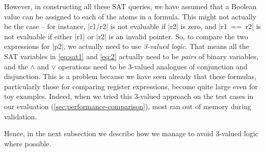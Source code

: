 {%
However, in constructing all these SAT queries, we have assumed that a Boolean
value can be assigned to each of the atoms in a formula. This might not actually be the case -- for instance,
\rtlinline|r1/r2| is not evaluable if \rtlinline|r2| is zero, and
\rtlinline|r1 == r2| is not evaluable if either \rtlinline|r1| or \rtlinline|r2|
is an invalid pointer.  So, to compare the two expressions for \rtlinline|p2|, we
actually need to use \emph{3-valued logic}.  That means all the SAT variables in \eqref{eq:sat1} and \eqref{eq:2} actually need to be \emph{pairs} of binary variables,
and the $\land$ and $\lor$ operations need to be 3-valued analogues of conjunction and disjunction. This is a problem because we have seen already that these formulas, particularly those for comparing register expressions, become quite large even for toy examples.
Indeed, when we tried this 3-valued approach on the test cases in our evaluation (\cref{sec:performance-comparison}), most ran out of memory during validation.


Hence, in the next subsection we describe how we manage to avoid 3-valued logic where possible.



}
